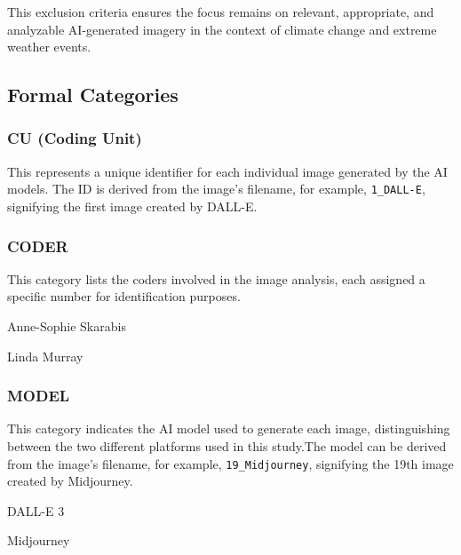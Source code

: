 This exclusion criteria ensures the focus remains on relevant, appropriate, and analyzable AI-generated imagery in the context of climate change and extreme weather events.

\subsection{Formal Categories}
 \subsubsection*{CU (Coding Unit)} 

 This represents a unique identifier for each individual image generated by the AI models. The ID is derived from the image's filename, for example, \texttt{1\_DALL-E}, signifying the first image created by DALL-E.
 
 \subsubsection*{CODER} 

 This category lists the coders involved in the image analysis, each assigned a specific number for identification purposes.
\begin{description}[leftmargin=2.5cm, style=multiline, labelwidth=1.5cm]
\item[1] Anne-Sophie Skarabis
\item[2] Linda Murray
\end{description}

 \subsubsection*{MODEL} 

 This category indicates the AI model used to generate each image, distinguishing between the two different platforms used in this study.The model can be derived from the image's filename, for example, \texttt{19\_Midjourney}, signifying the 19th image created by Midjourney.

\begin{description}[leftmargin=2.5cm, style=multiline, labelwidth=1.5cm]
\item[1] DALL-E 3
\item[2] Midjourney
\end{description}

